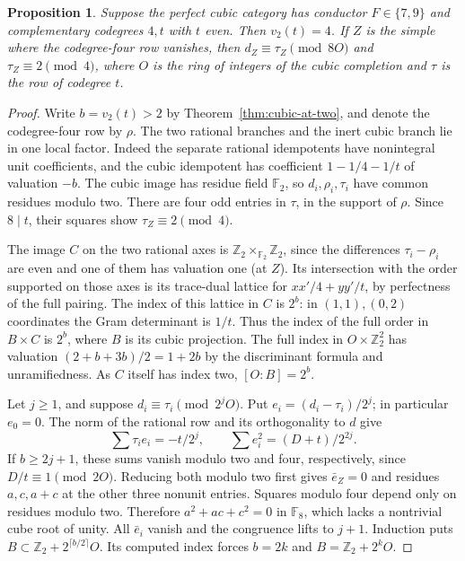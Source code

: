\documentclass[11pt,a4paper]{article}
\newtheorem{proposition}[theorem]{Proposition}
\numberwithin{equation}{section}
\begin{document}
\begin{proposition}\label{prop:cubic-four-depth}
Suppose the perfect cubic category has conductor $F\in\{7,9\}$ and
complementary codegrees $4,t$ with $t$ even. Then $v_2(t)=4$. If $Z$ is the simple where the codegree-four row vanishes, then $d_Z\equiv \tau_Z\pmod{8O}$ and $\tau_Z\equiv2\pmod4$, where $O$ is the ring of integers of the cubic completion and $\tau$ is the row of codegree $t$.
\end{proposition}
\begin{proof}
Write $b=v_2(t)>2$ by Theorem~\ref{thm:cubic-at-two}, and denote the codegree-four row by $\rho$. The two rational branches and the inert cubic branch lie in one local factor. Indeed the separate rational idempotents have nonintegral unit coefficients, and the cubic idempotent has coefficient $1-1/4-1/t$ of valuation $-b$. The cubic image has residue field $\mathbb F_2$, so $d_i,\rho_i,\tau_i$ have common residues modulo two. There are four odd entries in $\tau$, in the support of $\rho$. Since $8\mid t$, their squares show $\tau_Z\equiv2\pmod4$.

The image $C$ on the two rational axes is $\mathbb Z_2\times_{\mathbb F_2}\mathbb Z_2$, since the differences $\tau_i-\rho_i$ are even and one of them has valuation one (at $Z$). Its intersection with the order supported on those axes is its trace-dual lattice for $xx'/4+yy'/t$, by perfectness of the full pairing. The index of this lattice in $C$ is $2^b$: in $(1,1),(0,2)$ coordinates the Gram determinant is $1/t$. Thus the index of the full order in $B\times C$ is $2^b$, where $B$ is its cubic projection. The full index in $O\times\mathbb Z_2^2$ has valuation $(2+b+3b)/2=1+2b$ by the discriminant formula and unramifiedness. As $C$ itself has index two, $[O:B]=2^b$.

Let $j\ge1$, and suppose $d_i\equiv\tau_i\pmod{2^jO}$. Put $e_i=(d_i-\tau_i)/2^j$; in particular $e_0=0$. The norm of the rational row and its orthogonality to $d$ give
\[
 \sum\tau_i e_i=-t/2^j,\qquad\sum e_i^2=(D+t)/2^{2j}.
\]
If $b\ge2j+1$, these sums vanish modulo two and four, respectively, since $D/t\equiv1\pmod{2O}$. Reducing both modulo two first gives $\bar e_Z=0$ and residues $a,c,a+c$ at the other three nonunit entries. Squares modulo four depend only on residues modulo two. Therefore $a^2+ac+c^2=0$ in $\mathbb F_8$, which lacks a nontrivial cube root of unity. All $\bar e_i$ vanish and the congruence lifts to $j+1$. Induction puts $B\subset\mathbb Z_2+2^{\lceil b/2\rceil}O$. Its computed index forces $b=2k$ and $B=\mathbb Z_2+2^kO$.


\end{proof}
\end{document}
